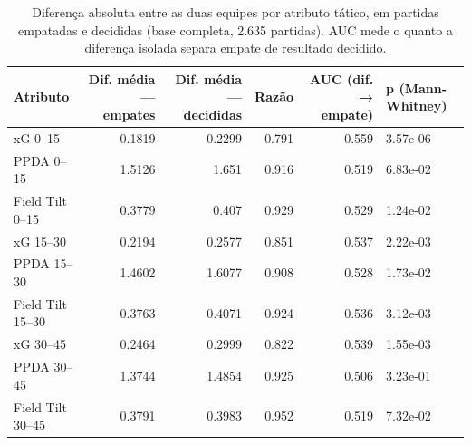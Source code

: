 \begin{table}[htbp]
\centering
\caption{Diferença absoluta entre as duas equipes por atributo tático, em partidas empatadas e decididas (base completa, 2.635 partidas). AUC mede o quanto a diferença isolada separa empate de resultado decidido.}
\label{tab:wp4-simetria}
\small
\begin{tabular}{lrrrrl}
\toprule
Atributo & Dif. média — empates & Dif. média — decididas & Razão & AUC (dif. → empate) & p (Mann-Whitney) \\
\midrule
xG 0–15 & 0.1819 & 0.2299 & 0.791 & 0.559 & 3.57e-06 \\
PPDA 0–15 & 1.5126 & 1.651 & 0.916 & 0.519 & 6.83e-02 \\
Field Tilt 0–15 & 0.3779 & 0.407 & 0.929 & 0.529 & 1.24e-02 \\
xG 15–30 & 0.2194 & 0.2577 & 0.851 & 0.537 & 2.22e-03 \\
PPDA 15–30 & 1.4602 & 1.6077 & 0.908 & 0.528 & 1.73e-02 \\
Field Tilt 15–30 & 0.3763 & 0.4071 & 0.924 & 0.536 & 3.12e-03 \\
xG 30–45 & 0.2464 & 0.2999 & 0.822 & 0.539 & 1.55e-03 \\
PPDA 30–45 & 1.3744 & 1.4854 & 0.925 & 0.506 & 3.23e-01 \\
Field Tilt 30–45 & 0.3791 & 0.3983 & 0.952 & 0.519 & 7.32e-02 \\
\bottomrule
\end{tabular}
\end{table}
